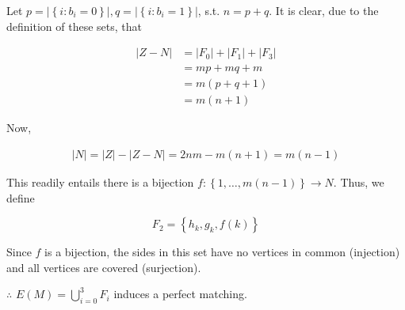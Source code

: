 \documentclass[a4paper]{article}
\begin{document}
Let $p = |\left\{ i : b_i = 0 \right\} |, q = |\left\{ i : b_i = 1 \right\}| $,
s.t. $n = p + q$. It is clear, due to the definition of these sets, that 

\begin{align*}
    |Z - N| &= |F_0| + |F_1| + |F_3| \\ 
            &=mp + mq + m \\ 
            &=m(p+q+1) \\ 
            &=m(n+1)
\end{align*}

Now,

\begin{align*}
    |N| = |Z| - |Z-N| = 2nm - m(n+1) = m(n-1)
\end{align*}

This readily entails there is a bijection $f : \left\{ 1, \ldots, m(n-1) \right\} \to N$. Thus, we define 

\begin{equation*}
    F_2 = \left\{ h_k, g_k, f(k) \right\} 
\end{equation*}

Since $f$ is a bijection, the sides in this set have no vertices in common
(injection) and all vertices are covered (surjection).

$\therefore $ $E(M) = \bigcup_{i=0}^{3} F_i$ induces a perfect matching.
\end{document}
